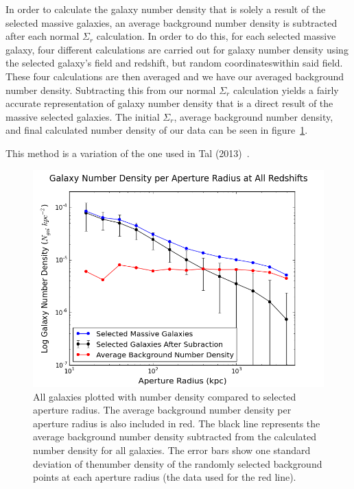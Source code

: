 \documentclass[apj]{emulateapj}
\begin{document}
In order to calculate the galaxy number density that is solely a result of the selected massive galaxies, an average background number density is subtracted after each normal $\Sigma_{r}$ calculation. In order to do this, for each selected massive galaxy, four different calculations are carried out for galaxy number density using the selected galaxy's field and redshift, but random coordinateswithin said field. These four calculations are then averaged and we have our averaged background number density. Subtracting this from our normal $\Sigma_{r}$ calculation yields a fairly accurate representation of galaxy number density that is a direct result of the massive selected galaxies. The initial $\Sigma_{r}$, average background number density, and final calculated number density of our data can be seen in figure~\ref{fig:compare}.

This method is a variation of the one used in Tal (2013)~\cite{2013ApJ...769...31T}.

\begin{figure}
\centering
\graphicspath{{C:/3d_hst/2015_finals/aperture_distance/}}
\includegraphics[width=\linewidth]{temp_compare}
\caption{\footnotesize All galaxies plotted with number density compared to selected aperture radius. The average background number density per aperture radius is also included in red. The black line represents the average background number density subtracted from the calculated number density for all galaxies. The error bars show one standard deviation of thenumber density of the randomly selected background points at each aperture radius (the data used for the red line).}
\label{fig:compare}
\end{figure}
\end{document}
